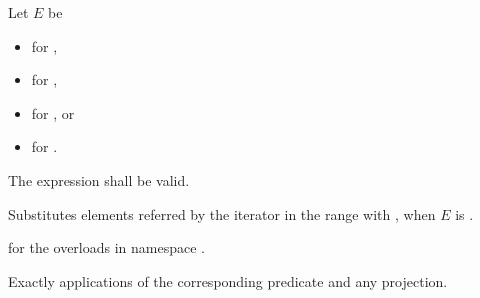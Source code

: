 \begin{itemdescr}
\pnum
Let $E$ be
\begin{itemize}
\item {} for ,
\item {} for ,
\item {} for , or
\item {} for .
\end{itemize}

\pnum
\requires
The expression
shall be valid.

\pnum
\effects
Substitutes elements referred by the iterator
in the range 
with ,
when $E$ is .

\pnum
\returns
{} for the overloads in namespace .

\pnum
\complexity
Exactly
applications of the corresponding predicate and any projection.
\end{itemdescr}

